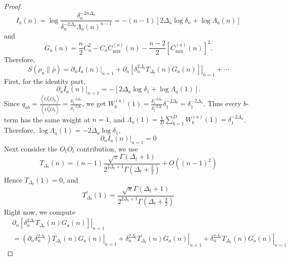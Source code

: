 \documentclass{article}
\theoremstyle{plain}
\theoremstyle{definition}
\theoremstyle{plain}
\begin{document}
\begin{proof}
\begin{equation}
  I_a(n)=\log \frac{\delta_n^{-2 n \Delta_a}}{\delta_n^{-2 \Delta_a} \Lambda_a(n)^{n-1}}=-(n-1)\left[2 \Delta_a \log \delta_n+\log \Lambda_a(n)\right]  
\end{equation}
and
\begin{equation}
   G_a(n)=\frac{n}{2} C_a^2-C_a C_{\operatorname{mix}}^{(a)}(n)-\frac{n-2}{2}\left[C_{\operatorname{mix}}^{(a)}(n)\right]^2 . 
\end{equation}
Therefore,
\begin{equation}
    S\left(\rho_a \| \bar{\rho}\right)=\left.\partial_n I_a(n)\right|_{n=1}+\left.\partial_n\left[\delta_n^{2 \Delta_t} T_{\Delta_t}(n) G_a(n)\right]\right|_{n=1}+\cdots
\end{equation}
First, for the identity part,
\begin{equation}
  \left.\partial_n I_a(n)\right|_{n=1}=-\left[2 \Delta_a \log \delta_1+\log \Lambda_a(1)\right] .  
\end{equation}
Since $q_{a b}=\frac{\left\langle O_a^{\dagger} O_a\right\rangle}{\left\langle O_b^{\dagger} O_b\right\rangle}=\frac{\delta_1^{-2 \Delta_a}}{\delta_1^{-2 \Delta_b}}$, we get $
W_b^{(a)}(1)=\frac{\delta_1^{-2 \Delta_a}}{\delta_1^{-2 \Delta_b}} \delta_1^{-2 \Delta_b}=\delta_1^{-2 \Delta_a}$. Thus every $b$-term has the same weight at $n=1$, and $
\Lambda_a(1)=\frac{1}{D} \sum_{b=1}^D W_b^{(a)}(1)=\delta_1^{-2 \Delta_a}$. Therefore, $\log \Lambda_a(1)=-2 \Delta_a \log \delta_1$,
\begin{equation}
    \left.\partial_n I_a(n)\right|_{n=1}=0
\end{equation}
Next consider the $O_t O_t$ contribution, we use
\begin{equation}
    T_{\Delta_t}(n)=(n-1) \frac{\sqrt{\pi} \Gamma\left(\Delta_t+1\right)}{2^{2 \Delta_t+1} \Gamma\left(\Delta_t+\frac{3}{2}\right)}+O\left((n-1)^2\right)
\end{equation}
Hence $T_{\Delta_t}(1)=0$, and
\begin{equation}
 T_{\Delta_t}^{\prime}(1)=\frac{\sqrt{\pi} \Gamma\left(\Delta_t+1\right)}{2^{2 \Delta_t+1} \Gamma\left(\Delta_t+\frac{3}{2}\right)}    
\end{equation}
Right now, we compute
\begin{equation}
    \begin{aligned}
& \left.\partial_n\left[\delta_n^{2 \Delta_t} T_{\Delta_t}(n) G_a(n)\right]\right|_{n=1} \\
& =\left.\left(\partial_n \delta_n^{2 \Delta_t}\right) T_{\Delta_t}(n) G_a(n)\right|_{n=1}+\left.\delta_n^{2 \Delta_t} T_{\Delta_t}^{\prime}(n) G_a(n)\right|_{n=1}+\left.\delta_n^{2 \Delta_t} T_{\Delta_t}(n) G_a^{\prime}(n)\right|_{n=1}

\end{aligned}
\end{equation}
\end{proof}
\end{document}
